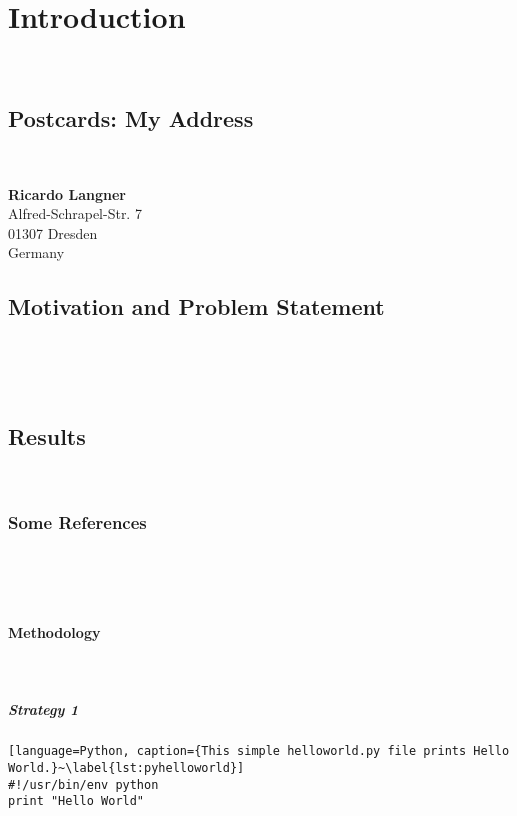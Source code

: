%
\chapter{Introduction}
~\label{sec:intro}




\section{Postcards: My Address}
~\label{sec:intro:address}

\textbf{Ricardo Langner} \\
Alfred-Schrapel-Str. 7 \\
01307 Dresden \\
Germany


\section{Motivation and Problem Statement}
~\label{sec:intro:motivation}

~\cite{Jurgens:2000}

\section{Results}
~\label{sec:intro:results}



\subsection{Some References}
~\label{sec:intro:results:refs}

~\cite{WEB:GNU:GPL:2010,WEB:Miede:2011}


\subsubsection{Methodology}
~\label{sec:intro:results:refs:method}



\paragraph{Strategy 1}


\begin{lstlisting}[language=Python, caption={This simple helloworld.py file prints Hello World.}~\label{lst:pyhelloworld}]
#!/usr/bin/env python
print "Hello World"
\end{lstlisting}

